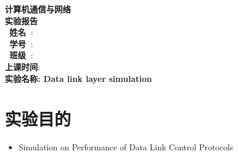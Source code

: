 \documentclass[a4paper]{ctexart}
\begin{document}
  \begin{titlepage}
      \songti
      \begin{center}
        \vspace*{1cm}
        {\fontsize{24pt}{0}
          \textbf{计算机通信与网络\\实验报告\\}
        }
        \vspace*{10cm}
        {\fontsize{16pt}{0}
          \textbf{\ 姓\quad 名\ }: \underline{}\\
          \textbf{\ 学\quad 号\ }: \underline{}\\
          \textbf{\ 班\quad 级\ }: \underline{}\\
          \textbf{上课时间}: \underline{}\\
        }
        \vspace*{7cm}
        {\fontsize{16pt}{0}
          \textbf{实验名称: {\Large Data link layer simulation}}
        }
      \end{center}
  \end{titlepage}


  \newpage
  \section{实验目的}
    \begin{itemize}
      \item Simulation on Performance of Data Link Control Protocols
    \end{itemize}
\end{document}
